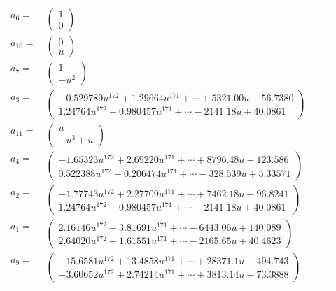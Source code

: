 \documentclass[1p]{elsarticle_modified}
\theoremstyle{definition}
\begin{document}
\begin{tabular}{m{7pt} m{180pt} m{7pt} m{180pt} }
\flushright $a_{6}=$&$\begin{pmatrix}1\\0\end{pmatrix}$ \\
\flushright $a_{10}=$&$\begin{pmatrix}0\\u\end{pmatrix}$ \\
\flushright $a_{7}=$&$\begin{pmatrix}1\\- u^2\end{pmatrix}$ \\
\flushright $a_{3}=$&$\begin{pmatrix}-0.529789 u^{172}+1.29664 u^{171}+\cdots+5321.00 u-56.7380\\1.24764 u^{172}-0.980457 u^{171}+\cdots-2141.18 u+40.0861\end{pmatrix}$ \\
\flushright $a_{11}=$&$\begin{pmatrix}u\\- u^3+u\end{pmatrix}$ \\
\flushright $a_{4}=$&$\begin{pmatrix}-1.65323 u^{172}+2.69220 u^{171}+\cdots+8796.48 u-123.586\\0.522388 u^{172}-0.206474 u^{171}+\cdots-328.539 u+5.33571\end{pmatrix}$ \\
\flushright $a_{2}=$&$\begin{pmatrix}-1.77743 u^{172}+2.27709 u^{171}+\cdots+7462.18 u-96.8241\\1.24764 u^{172}-0.980457 u^{171}+\cdots-2141.18 u+40.0861\end{pmatrix}$ \\
\flushright $a_{1}=$&$\begin{pmatrix}2.16146 u^{172}-3.81691 u^{171}+\cdots-6443.06 u+140.089\\2.64020 u^{172}-1.61551 u^{171}+\cdots-2165.65 u+40.4623\end{pmatrix}$ \\
\flushright $a_{9}=$&$\begin{pmatrix}-15.6581 u^{172}+13.4858 u^{171}+\cdots+28371.1 u-494.743\\-3.60652 u^{172}+2.74214 u^{171}+\cdots+3813.14 u-73.3888\end{pmatrix}$ \\

\end{tabular}
\end{document}
